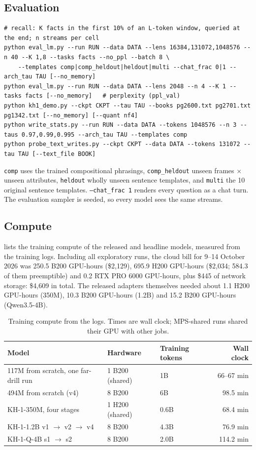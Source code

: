 \subsection{Evaluation}
\begin{lstlisting}
# recall: K facts in the first 10% of an L-token window, queried at the end; n streams per cell
python eval_lm.py --run RUN --data DATA --lens 16384,131072,1048576 --n 40 --K 1,8 --tasks facts --no_ppl --batch 8 \
    --templates comp|comp_heldout|heldout|multi --chat_frac 0|1 --arch_tau TAU [--no_memory]
python eval_lm.py --run RUN --data DATA --lens 2048 --n 4 --K 1 --tasks facts [--no_memory]   # perplexity (ppl_val)
python kh1_demo.py --ckpt CKPT --tau TAU --books pg2600.txt pg2701.txt pg1342.txt [--no_memory] [--quant nf4]
python write_stats.py --run RUN --data DATA --tokens 1048576 --n 3 --taus 0.97,0.99,0.995 --arch_tau TAU --templates comp
python probe_text_writes.py --ckpt CKPT --data DATA --tokens 131072 --tau TAU [--text_file BOOK]
\end{lstlisting}
\texttt{comp} uses the trained compositional phrasings, \texttt{comp\_heldout} unseen frames $\times$ unseen attributes, \texttt{heldout} wholly unseen sentence templates, and \texttt{multi} the 10 original sentence templates. \texttt{--chat\_frac 1} renders every question as a chat turn. The evaluation sampler is seeded, so every model sees the same streams.

\subsection{Compute}
 lists the training compute of the released and headline models, measured from the training logs. Including all exploratory runs, the cloud bill for 9--14 October 2026 was 250.5 B200 GPU-hours (\$2{,}129), 695.9 H200 GPU-hours (\$2{,}034; 584.3 of them preemptible) and 0.2 RTX PRO 6000 GPU-hours, plus \$445 of network storage: \$4{,}609 in total. The released adapters themselves needed about 1.1 H200 GPU-hours (350M), 10.3 B200 GPU-hours (1.2B) and 15.2 B200 GPU-hours (Qwen3.5-4B).

\begin{table}[h]
\centering
\small
\caption{Training compute from the logs. Times are wall clock; MPS-shared runs shared their GPU with other jobs.}
\label{tab:compute}
\begin{tabular}{@{}lllr@{}}
\toprule
Model & Hardware & Training tokens & Wall clock \\
\midrule
117M from scratch, one far-drill run & 1 B200 (shared) & 1B & 66--67 min \\
494M from scratch (v4) & 8 B200 & 6B & 98.5 min \\
KH-1-350M, four stages & 1 H200 (shared) & 0.6B & 68.4 min \\
KH-1-1.2B v1 $\to$ v2 $\to$ v4 & 8 B200 & 4.3B & 76.9 min \\
KH-1-Q-4B s1 $\to$ s2 & 8 B200 & 2.0B & 114.2 min \\
\bottomrule
\end{tabular}
\end{table}
